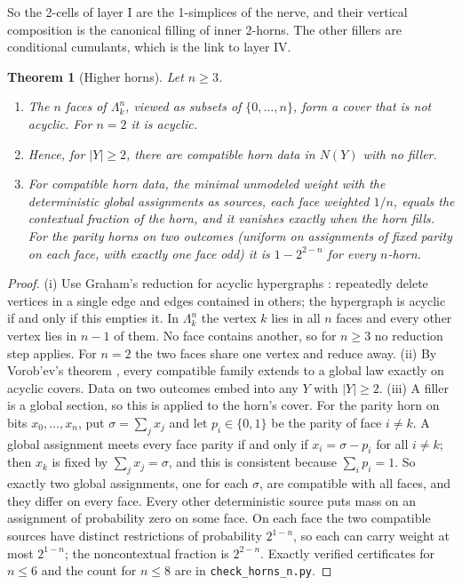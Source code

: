\documentclass[11pt]{article}
\newtheorem{theorem}{Theorem}[section]
\theoremstyle{definition}
\theoremstyle{remark}
\begin{document}
So the 2-cells of layer I are the 1-simplices of the nerve, and their vertical composition is the canonical
filling of inner 2-horns. The other fillers are conditional cumulants, which is the link to layer IV.

\begin{theorem}[Higher horns]\label{thm:higherhorn}
Let $n\ge3$.
\begin{enumerate}[label=(\roman*)]
\item The $n$ faces of $\Lambda^n_k$, viewed as subsets of $\{0,\dots,n\}$, form a cover that is not acyclic. For $n=2$ it is
  acyclic.
\item Hence, for $\lvert Y\rvert\ge2$, there are compatible horn data in $N(Y)$ with no filler.
\item For compatible horn data, the minimal unmodeled weight with the deterministic global assignments as
  sources, each face weighted $1/n$, equals the contextual fraction of the horn, and it vanishes exactly when
  the horn fills. For the parity horns on two outcomes (uniform on assignments of fixed parity on each face, with
  exactly one face odd) it is $1-2^{2-n}$ for every $n$-horn.
\end{enumerate}
\end{theorem}
\begin{proof}
(i) Use Graham's reduction for acyclic hypergraphs \cite{BFMY1983}: repeatedly delete vertices in a single edge and
edges contained in others; the hypergraph is acyclic if and only if this empties it. In $\Lambda^n_k$ the vertex $k$
lies in all $n$ faces and every other vertex lies in $n-1$ of them. No face contains another, so for $n\ge3$ no
reduction step applies. For $n=2$ the two faces share one vertex and reduce away. (ii) By Vorob'ev's theorem
\cite{Vorobev1962}, every compatible family extends to a global law exactly on acyclic covers. Data on two outcomes
embed into any $Y$ with $\lvert Y\rvert\ge2$. (iii) A filler is a global section, so this is
\cite[Thm.~7.12]{Awasthi-Attribution} applied to the horn's cover. For the parity horn on bits $x_0,\dots,x_n$, put $\sigma=\sum_jx_j$ and let
$p_i\in\{0,1\}$ be the parity of face $i\ne k$. A global assignment meets every face parity if and only if
$x_i=\sigma-p_i$ for all $i\ne k$; then $x_k$ is fixed by $\sum_jx_j=\sigma$, and this is consistent because $\sum_ip_i=1$.
So exactly two global assignments, one for each $\sigma$, are compatible with all faces, and they differ on every face.
Every other deterministic source puts mass on an assignment of probability zero on some face. On each face the two
compatible sources have distinct restrictions of probability $2^{1-n}$, so each can carry weight at most $2^{1-n}$;
the noncontextual fraction is $2^{2-n}$. Exactly verified certificates for $n\le6$ and the count for $n\le8$ are in
\texttt{check\_horns\_n.py}.
\end{proof}
\end{document}
